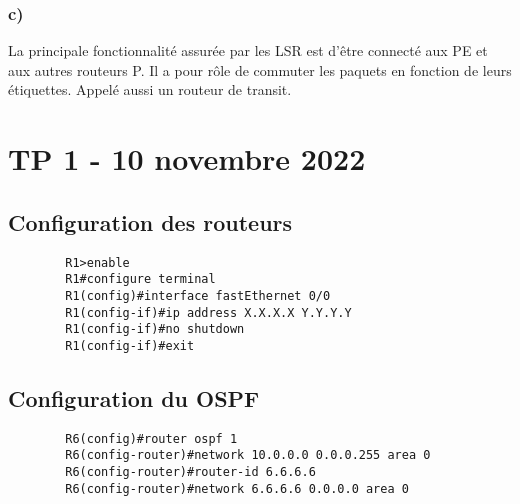 \documentclass[12pt, a4paper]{article}
\begin{document}
    \subsubsection{c)}
    La principale fonctionnalité assurée par les LSR est d'être connecté aux 
    PE et aux autres routeurs P. Il a pour rôle de commuter les paquets en 
    fonction de leurs étiquettes. Appelé aussi un routeur de transit.

\newpage

\section{TP 1 - 10 novembre 2022}
\subsection{Configuration des routeurs}
    \begin{verbatim}
        R1>enable
        R1#configure terminal
        R1(config)#interface fastEthernet 0/0
        R1(config-if)#ip address X.X.X.X Y.Y.Y.Y
        R1(config-if)#no shutdown
        R1(config-if)#exit
    \end{verbatim}

\subsection{Configuration du OSPF}
    \begin{verbatim}
        R6(config)#router ospf 1
        R6(config-router)#network 10.0.0.0 0.0.0.255 area 0
        R6(config-router)#router-id 6.6.6.6
        R6(config-router)#network 6.6.6.6 0.0.0.0 area 0
    \end{verbatim}
\end{document}
